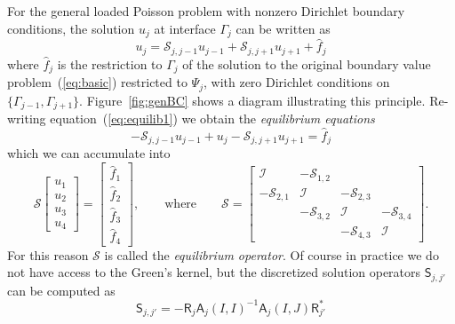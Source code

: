 \documentclass[final,onefignum,onetabnum]{siamart250211}
\newcommand{\mtx}[1]{\bm{\mathsf{#1}}}
\theoremstyle{definition}
\begin{document}
For the general loaded Poisson problem with nonzero Dirichlet boundary conditions, the solution $u_j$ at interface $\Gamma_j$ can be written as
\begin{equation}\label{eq:equilib1}
    u_j = \mathcal{S}_{j,j-1}u_{j-1}+\mathcal{S}_{j,j+1}u_{j+1}+\hat{f}_j
\end{equation}
where $\hat{f}_j$ is the restriction to $\Gamma_j$ of the solution to the original boundary value problem~(\ref{eq:basic}) restricted to $\Psi_j$, with zero Dirichlet conditions on $\{\Gamma_{j-1},\Gamma_{j+1}\}$. Figure~\ref{fig:genBC} shows a diagram illustrating this principle. Re-writing equation~(\ref{eq:equilib1}) we obtain the \textit{equilibrium equations}
\begin{equation}\label{eq:equilib2}
    -\mathcal{S}_{j,j-1}u_{j-1}+u_j -\mathcal{S}_{j,j+1}u_{j+1}=\hat{f}_j
\end{equation}
which we can accumulate into
\begin{equation}
\label{eq:modelScond}
\mathcal{S}
\left[\begin{array}{rrrr}
u_{1} \\ u_{2} \\ u_{3} \\ u_{4}
\end{array}\right]
=
\left[\begin{array}{rrrr}
\hat{f}_{1} \\ \hat{f}_{2} \\ \hat{f}_{3} \\ \hat{f}_{4}
\end{array}\right],
\qquad\mbox{where}\qquad
\mathcal{S} =
\left[\begin{array}{rrrr}
 \mathcal{I}       & -\mathcal{S}_{1,2} &         &         \\
-\mathcal{S}_{2,1} &  \mathcal{I}       & -\mathcal{S}_{2,3} &        \\
 & -\mathcal{S}_{3,2} &  \mathcal{I}       & -\mathcal{S}_{3,4} \\
 & & -\mathcal{S}_{4,3} &  \mathcal{I}
\end{array}\right].
\end{equation}
For this reason $\mathcal{S}$ is called the \textit{equilibrium operator}.
Of course in practice we do not have access to the Green's kernel, but the discretized solution operators $\mtx{S}_{j,j'}$ can be computed as
\begin{equation}\label{eq:defS}
    \mtx{S}_{j,j'} = -\mtx{R}_j\mtx{A}_j(I,I)^{-1}\mtx{A}_j(I,J)\mtx{R}_{j'}^*
\end{equation}
\end{document}
